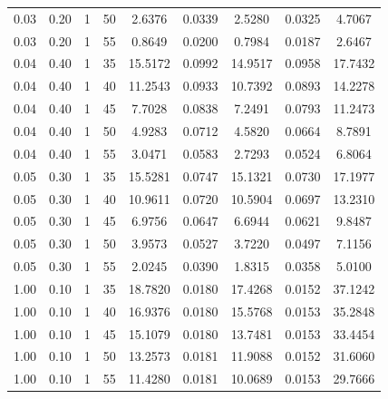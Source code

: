 \documentclass[11pt,a4paper]{article}
\theoremstyle{plain}
\theoremstyle{definition}
\begin{document}
\begin{table}[H]
\begin{tabular}{cccc|cc|cc|c}
    0.03 & 0.20 & 1 & 50 &  2.6376 & 0.0339 &  2.5280 & 0.0325 &  4.7067 \\
    0.03 & 0.20 & 1 & 55 &  0.8649 & 0.0200 &  0.7984 & 0.0187 &  2.6467 \\
    \midrule
    0.04 & 0.40 & 1 & 35 & 15.5172 & 0.0992 & 14.9517 & 0.0958 & 17.7432 \\
    0.04 & 0.40 & 1 & 40 & 11.2543 & 0.0933 & 10.7392 & 0.0893 & 14.2278 \\
    0.04 & 0.40 & 1 & 45 &  7.7028 & 0.0838 &  7.2491 & 0.0793 & 11.2473 \\
    0.04 & 0.40 & 1 & 50 &  4.9283 & 0.0712 &  4.5820 & 0.0664 &  8.7891 \\
    0.04 & 0.40 & 1 & 55 &  3.0471 & 0.0583 &  2.7293 & 0.0524 &  6.8064 \\
    \midrule
    0.05 & 0.30 & 1 & 35 & 15.5281 & 0.0747 & 15.1321 & 0.0730 & 17.1977 \\
    0.05 & 0.30 & 1 & 40 & 10.9611 & 0.0720 & 10.5904 & 0.0697 & 13.2310 \\
    0.05 & 0.30 & 1 & 45 &  6.9756 & 0.0647 &  6.6944 & 0.0621 &  9.8487 \\
    0.05 & 0.30 & 1 & 50 &  3.9573 & 0.0527 &  3.7220 & 0.0497 &  7.1156 \\
    0.05 & 0.30 & 1 & 55 &  2.0245 & 0.0390 &  1.8315 & 0.0358 &  5.0100 \\
    \midrule
    1.00 & 0.10 & 1 & 35 & 18.7820 & 0.0180 & 17.4268 & 0.0152 & 37.1242 \\
    1.00 & 0.10 & 1 & 40 & 16.9376 & 0.0180 & 15.5768 & 0.0153 & 35.2848 \\
    1.00 & 0.10 & 1 & 45 & 15.1079 & 0.0180 & 13.7481 & 0.0153 & 33.4454 \\
    1.00 & 0.10 & 1 & 50 & 13.2573 & 0.0181 & 11.9088 & 0.0152 & 31.6060 \\
    1.00 & 0.10 & 1 & 55 & 11.4280 & 0.0181 & 10.0689 & 0.0153 & 29.7666 \\
    \bottomrule
  \end{tabular}
\end{table}
\end{document}
